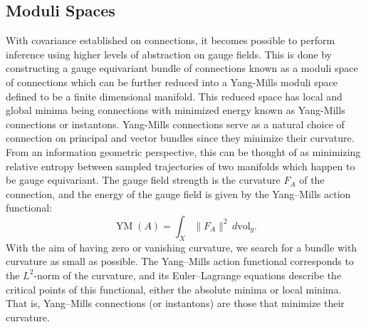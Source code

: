 \documentclass{article}
\begin{document}
\subsection{Moduli Spaces}
    With covariance established on connections, it becomes possible to perform inference using higher levels of abstraction on gauge fields. This is done by constructing a gauge equivariant bundle of connections known as a moduli space of connections which  can be further reduced into a Yang-Mills moduli space defined to be a finite dimensional manifold. This reduced space has local and global minima being connections with minimized energy known as Yang-Mills connections or instantons. Yang-Mills connections serve as a natural choice of connection on principal and vector bundles since they minimize their curvature. From an information geometric perspective, this can be thought of as minimizing relative entropy between sampled trajectories of two manifolds which happen to be gauge equivariant. The gauge field strength is the curvature $F_{A}$ of the connection, and the energy of the gauge field is given by the Yang–Mills action functional:
    \[
    {\displaystyle \operatorname {YM} (A)=\int _{X}\|F_{A}\|^{2}\,d\mathrm {vol} _{g}.}
    \]
    With the aim of having zero or vanishing curvature, we search for a bundle with curvature as small as possible. The Yang–Mills action functional corresponds to the $L^{2}$-norm of the curvature, and its Euler–Lagrange equations describe the critical points of this functional, either the absolute minima or local minima. That is, Yang–Mills connections (or instantons) are those that minimize their curvature.  
\end{document}
